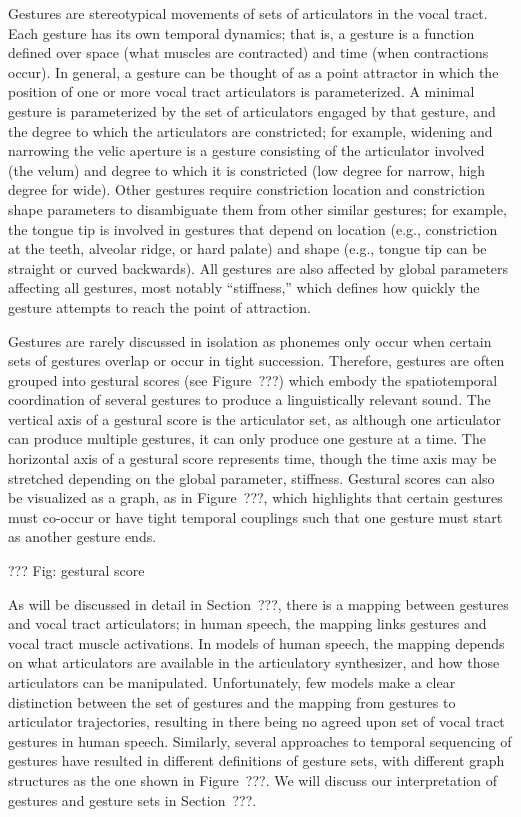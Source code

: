Gestures are stereotypical movements
of sets of articulators in the vocal tract.
Each gesture has its own temporal dynamics;
that is, a gesture is a function defined
over space (what muscles are contracted)
and time (when contractions occur).
In general, a gesture can be thought of
as a point attractor
in which the position
of one or more vocal tract
articulators is parameterized.
A minimal gesture is parameterized by
the set of articulators engaged
by that gesture,
and the degree to which
the articulators are constricted;
for example,
widening and narrowing the velic aperture
is a gesture consisting of
the articulator involved
(the velum)
and degree to which it is constricted
(low degree for narrow, high degree for wide).
Other gestures require constriction location
and constriction shape parameters
to disambiguate them from other similar gestures;
for example, the tongue tip
is involved in gestures
that depend on location
(e.g., constriction at
the teeth, alveolar ridge, or hard palate)
and shape
(e.g., tongue tip can be straight
or curved backwards).
All gestures are also affected by
global parameters affecting all gestures,
most notably ``stiffness,''
which defines how quickly
the gesture attempts to reach
the point of attraction.

Gestures are rarely discussed in isolation
as phonemes only occur when certain
sets of gestures overlap
or occur in tight succession.
Therefore, gestures are often
grouped into gestural scores
(see Figure~???)
which embody the spatiotemporal
coordination of several gestures
to produce a linguistically
relevant sound.
The vertical axis of a gestural score
is the articulator set,
as although one articulator
can produce multiple gestures,
it can only produce one gesture
at a time.
The horizontal axis of
a gestural score represents time,
though the time axis may be
stretched depending on
the global parameter, stiffness.
Gestural scores can also
be visualized as a graph,
as in Figure~???,
which highlights that
certain gestures must co-occur
or have tight temporal couplings
such that one gesture
must start as another gesture ends.

??? Fig: gestural score

As will be discussed in detail
in Section~???, there is a mapping
between gestures and vocal tract articulators;
in human speech, the mapping links
gestures and vocal tract muscle activations.
In models of human speech,
the mapping depends on what articulators
are available in the articulatory synthesizer,
and how those articulators can be manipulated.
Unfortunately, few models make a clear distinction
between the set of gestures
and the mapping from gestures
to articulator trajectories,
resulting in there being
no agreed upon set of vocal tract gestures
in human speech.
Similarly, several approaches to
temporal sequencing of gestures
have resulted in different
definitions of gesture sets,
with different graph structures as
the one shown in Figure~???.
We will discuss our interpretation
of gestures and gesture sets
in Section~???.

